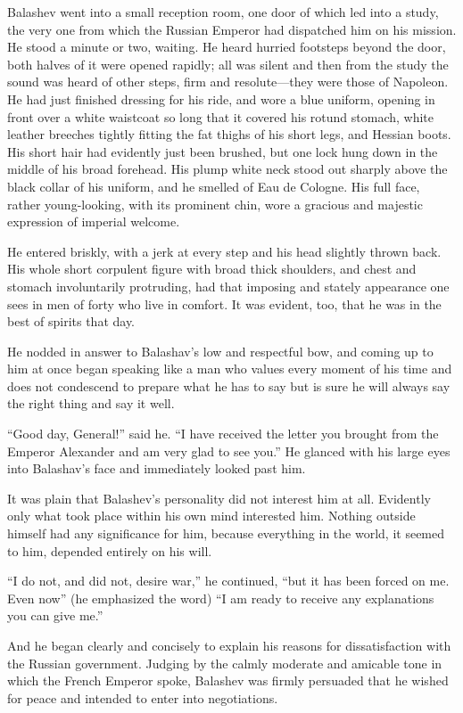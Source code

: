 Balashev went into a small reception room, one door of which led
into a study, the very one from which the Russian Emperor had
dispatched him on his mission. He stood a minute or two,
waiting. He heard hurried footsteps beyond the door, both halves
of it were opened rapidly; all was silent and then from the study
the sound was heard of other steps, firm and resolute---they were
those of Napoleon. He had just finished dressing for his ride,
and wore a blue uniform, opening in front over a white waistcoat
so long that it covered his rotund stomach, white leather
breeches tightly fitting the fat thighs of his short legs, and
Hessian boots. His short hair had evidently just been brushed,
but one lock hung down in the middle of his broad forehead. His
plump white neck stood out sharply above the black collar of his
uniform, and he smelled of Eau de Cologne. His full face, rather
young-looking, with its prominent chin, wore a gracious and
majestic expression of imperial welcome.

He entered briskly, with a jerk at every step and his head
slightly thrown back. His whole short corpulent figure with broad
thick shoulders, and chest and stomach involuntarily protruding,
had that imposing and stately appearance one sees in men of forty
who live in comfort. It was evident, too, that he was in the best
of spirits that day.

He nodded in answer to Balashav's low and respectful bow, and
coming up to him at once began speaking like a man who values
every moment of his time and does not condescend to prepare what
he has to say but is sure he will always say the right thing and
say it well.

``Good day, General!'' said he. ``I have received the letter you
brought from the Emperor Alexander and am very glad to see you.''
He glanced with his large eyes into Balashav's face and
immediately looked past him.

It was plain that Balashev's personality did not interest him at
all.  Evidently only what took place within his own mind
interested him.  Nothing outside himself had any significance for
him, because everything in the world, it seemed to him, depended
entirely on his will.

``I do not, and did not, desire war,'' he continued, ``but it has
been forced on me. Even now'' (he emphasized the word) ``I am
ready to receive any explanations you can give me.''

And he began clearly and concisely to explain his reasons for
dissatisfaction with the Russian government. Judging by the
calmly moderate and amicable tone in which the French Emperor
spoke, Balashev was firmly persuaded that he wished for peace and
intended to enter into negotiations.

